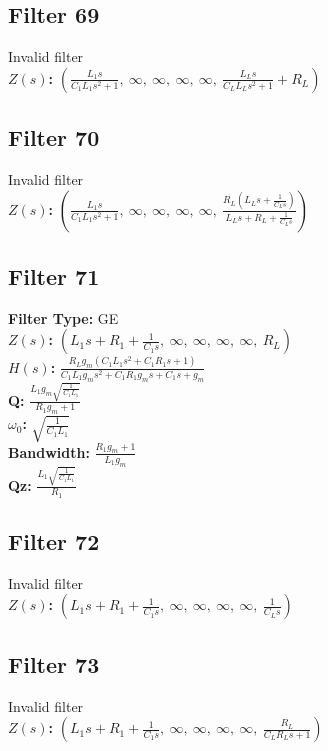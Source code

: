 \documentclass{article}
\begin{document}
\subsection*{Filter 69}
Invalid filter \\ 
\textbf{$Z(s)$:} $\left( \frac{L_{1} s}{C_{1} L_{1} s^{2} + 1}, \  \infty, \  \infty, \  \infty, \  \infty, \  \frac{L_{L} s}{C_{L} L_{L} s^{2} + 1} + R_{L}\right)$ \\ 
\subsection*{Filter 70}
Invalid filter \\ 
\textbf{$Z(s)$:} $\left( \frac{L_{1} s}{C_{1} L_{1} s^{2} + 1}, \  \infty, \  \infty, \  \infty, \  \infty, \  \frac{R_{L} \left(L_{L} s + \frac{1}{C_{L} s}\right)}{L_{L} s + R_{L} + \frac{1}{C_{L} s}}\right)$ \\ 
\subsection*{Filter 71}
\textbf{Filter Type:} GE \\ 
\textbf{$Z(s)$:} $\left( L_{1} s + R_{1} + \frac{1}{C_{1} s}, \  \infty, \  \infty, \  \infty, \  \infty, \  R_{L}\right)$ \\ 
\textbf{$H(s)$:} $\frac{R_{L} g_{m} \left(C_{1} L_{1} s^{2} + C_{1} R_{1} s + 1\right)}{C_{1} L_{1} g_{m} s^{2} + C_{1} R_{1} g_{m} s + C_{1} s + g_{m}}$ \\ 
\textbf{Q:} $\frac{L_{1} g_{m} \sqrt{\frac{1}{C_{1} L_{1}}}}{R_{1} g_{m} + 1}$ \\ 
\textbf{$\omega_0$:} $\sqrt{\frac{1}{C_{1} L_{1}}}$ \\ 
\textbf{Bandwidth:} $\frac{R_{1} g_{m} + 1}{L_{1} g_{m}}$ \\ 
\textbf{Qz:} $\frac{L_{1} \sqrt{\frac{1}{C_{1} L_{1}}}}{R_{1}}$ \\ 
\subsection*{Filter 72}
Invalid filter \\ 
\textbf{$Z(s)$:} $\left( L_{1} s + R_{1} + \frac{1}{C_{1} s}, \  \infty, \  \infty, \  \infty, \  \infty, \  \frac{1}{C_{L} s}\right)$ \\ 
\subsection*{Filter 73}
Invalid filter \\ 
\textbf{$Z(s)$:} $\left( L_{1} s + R_{1} + \frac{1}{C_{1} s}, \  \infty, \  \infty, \  \infty, \  \infty, \  \frac{R_{L}}{C_{L} R_{L} s + 1}\right)$ \\ 
\end{document}
